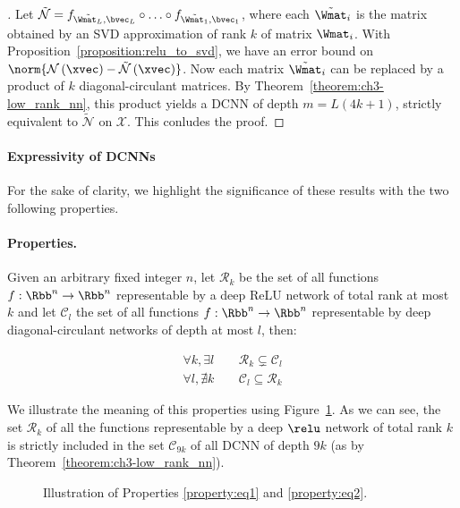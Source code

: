 \begin{proof}[]
Let $\tilde{\mathcal{N}} = f_{\tilde{\Wmat_{L}},\bvec_{L}} \circ \ldots \circ f_{\tilde{\Wmat_{1}},\bvec_{1}}$, where each $\tilde{\Wmat}_{i}$ is the matrix obtained by an SVD approximation of rank $k$ of matrix $\Wmat_{i}$.
With Proposition~\ref{proposition:relu_to_svd}, we have an error bound on $\norm{\mathcal{N} \left(\xvec\right) - \tilde{\mathcal{N}} \left(\xvec\right)}$.
Now each matrix $\tilde{\Wmat}_{i}$ can be replaced by a product of $k$ diagonal-circulant matrices.
By Theorem~\ref{theorem:ch3-low_rank_nn}, this product yields a DCNN of depth $m = L(4k+1)$, strictly equivalent to $\tilde{\mathcal{N}}$ on $\mathcal{X}$.
This conludes the proof.
\end{proof}



\paragraph{Expressivity of DCNNs}

For the sake of clarity, we highlight the significance of these results with the two following properties.

\paragraph{Properties.}
Given an arbitrary fixed integer $n$, let $\mathcal{R}_{k}$ be the set of all functions $f:\Rbb^{n} \rightarrow \Rbb^{n}$ representable by a deep ReLU network of total rank at most $k$ and let $\mathcal{C}_{l}$ the set of all functions $f:\Rbb^{n} \rightarrow \Rbb^{n}$ representable by deep diagonal-circulant networks of depth at most $l$, then:

\begin{align}
  \label{property:eq1} \forall k,\exists l \, &\quad \mathcal{R}_{k} \subsetneq \mathcal{C}_{l} \\
  \label{property:eq2} \forall l,\nexists k\, &\quad \mathcal{C}_{l} \subseteq \mathcal{R}_{k}
\end{align}

We illustrate the meaning of this properties using Figure~\ref{figure:ch3-circfig}.
As we can see, the set $\mathcal R_{k}$ of all the functions representable by a deep $\relu$ network of total rank $k$ is strictly included in the set $\mathcal C_{9k}$ of all DCNN of depth $9k$ (as by Theorem~\ref{theorem:ch3-low_rank_nn}).

\begin{figure}[htb]
    \begin{center}
      
    \end{center}
    \caption{Illustration of Properties \ref{property:eq1} and \ref{property:eq2}.}
    \label{figure:ch3-circfig}
\end{figure}


